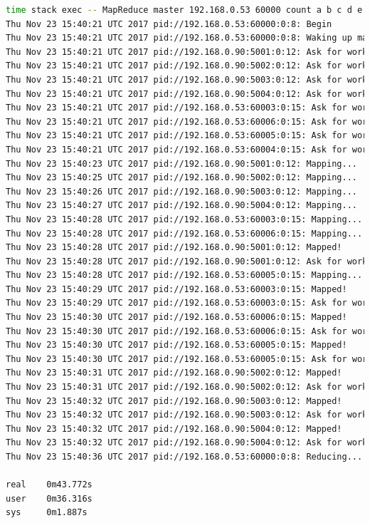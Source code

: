 \documentclass[12pt]{article}
\begin{document}
\begin{lstlisting}[language=bash, basicstyle=\ttfamily\small, caption=4 локальних та 4 віддалених мапера]
time stack exec -- MapReduce master 192.168.0.53 60000 count a b c d e f g >> /dev/null
Thu Nov 23 15:40:21 UTC 2017 pid://192.168.0.53:60000:0:8: Begin
Thu Nov 23 15:40:21 UTC 2017 pid://192.168.0.53:60000:0:8: Waking up mappers...
Thu Nov 23 15:40:21 UTC 2017 pid://192.168.0.90:5001:0:12: Ask for work
Thu Nov 23 15:40:21 UTC 2017 pid://192.168.0.90:5002:0:12: Ask for work
Thu Nov 23 15:40:21 UTC 2017 pid://192.168.0.90:5003:0:12: Ask for work
Thu Nov 23 15:40:21 UTC 2017 pid://192.168.0.90:5004:0:12: Ask for work
Thu Nov 23 15:40:21 UTC 2017 pid://192.168.0.53:60003:0:15: Ask for work
Thu Nov 23 15:40:21 UTC 2017 pid://192.168.0.53:60006:0:15: Ask for work
Thu Nov 23 15:40:21 UTC 2017 pid://192.168.0.53:60005:0:15: Ask for work
Thu Nov 23 15:40:21 UTC 2017 pid://192.168.0.53:60004:0:15: Ask for work
Thu Nov 23 15:40:23 UTC 2017 pid://192.168.0.90:5001:0:12: Mapping...
Thu Nov 23 15:40:25 UTC 2017 pid://192.168.0.90:5002:0:12: Mapping...
Thu Nov 23 15:40:26 UTC 2017 pid://192.168.0.90:5003:0:12: Mapping...
Thu Nov 23 15:40:27 UTC 2017 pid://192.168.0.90:5004:0:12: Mapping...
Thu Nov 23 15:40:28 UTC 2017 pid://192.168.0.53:60003:0:15: Mapping...
Thu Nov 23 15:40:28 UTC 2017 pid://192.168.0.53:60006:0:15: Mapping...
Thu Nov 23 15:40:28 UTC 2017 pid://192.168.0.90:5001:0:12: Mapped!
Thu Nov 23 15:40:28 UTC 2017 pid://192.168.0.90:5001:0:12: Ask for work
Thu Nov 23 15:40:28 UTC 2017 pid://192.168.0.53:60005:0:15: Mapping...
Thu Nov 23 15:40:29 UTC 2017 pid://192.168.0.53:60003:0:15: Mapped!
Thu Nov 23 15:40:29 UTC 2017 pid://192.168.0.53:60003:0:15: Ask for work
Thu Nov 23 15:40:30 UTC 2017 pid://192.168.0.53:60006:0:15: Mapped!
Thu Nov 23 15:40:30 UTC 2017 pid://192.168.0.53:60006:0:15: Ask for work
Thu Nov 23 15:40:30 UTC 2017 pid://192.168.0.53:60005:0:15: Mapped!
Thu Nov 23 15:40:30 UTC 2017 pid://192.168.0.53:60005:0:15: Ask for work
Thu Nov 23 15:40:31 UTC 2017 pid://192.168.0.90:5002:0:12: Mapped!
Thu Nov 23 15:40:31 UTC 2017 pid://192.168.0.90:5002:0:12: Ask for work
Thu Nov 23 15:40:32 UTC 2017 pid://192.168.0.90:5003:0:12: Mapped!
Thu Nov 23 15:40:32 UTC 2017 pid://192.168.0.90:5003:0:12: Ask for work
Thu Nov 23 15:40:32 UTC 2017 pid://192.168.0.90:5004:0:12: Mapped!
Thu Nov 23 15:40:32 UTC 2017 pid://192.168.0.90:5004:0:12: Ask for work
Thu Nov 23 15:40:36 UTC 2017 pid://192.168.0.53:60000:0:8: Reducing...

real    0m43.772s
user    0m36.316s
sys     0m1.887s
\end{lstlisting}
\end{document}
